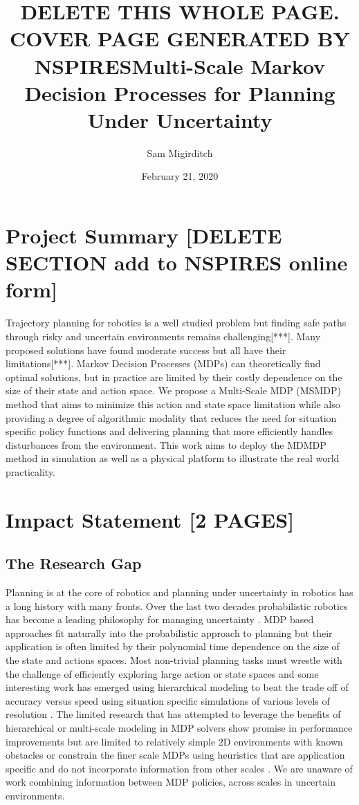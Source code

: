 \documentclass[12pt]{article}
\title{\textbf{DELETE THIS WHOLE PAGE. COVER PAGE GENERATED BY NSPIRES}\linebreak Multi-Scale Markov Decision Processes for Planning Under Uncertainty}
\author{Sam Migirditch}
\date{February 21, 2020}
\begin{document}
\maketitle

\newpage
\section{Project Summary [DELETE SECTION add to NSPIRES online form]}

Trajectory planning for robotics is a well studied problem but finding safe paths through risky and uncertain environments remains challenging[***]. Many proposed solutions have found moderate success but all have their limitations[***]. Markov Decision Processes (MDPs) can theoretically find optimal solutions, but in practice are limited by their costly dependence on the size of their state and action space. We propose a  Multi-Scale MDP (MSMDP) method that aims to minimize this action and state space limitation while also providing a degree of algorithmic modality that reduces the need for situation specific policy functions and delivering planning that more efficiently handles disturbances from the environment. This work aims to deploy the MDMDP method in simulation as well as a physical platform to illustrate the real world practicality. 

\newpage
\section{Impact Statement [2 PAGES]}

\subsection{The Research Gap}

Planning is at the core of robotics and planning under uncertainty in robotics has a long history with many fronts. Over the last two decades probabilistic robotics has become a leading philosophy for managing uncertainty \cite{thrun_probabilistic_2005}. MDP based approaches fit naturally into the probabilistic approach to planning but their application is often limited by their polynomial time dependence on the size of the state and actions spaces. Most non-trivial planning tasks must wrestle with the challenge of efficiently exploring large action or state spaces and some interesting work has emerged using hierarchical modeling to beat the trade off of accuracy versus speed using situation specific simulations of various levels of resolution \cite{fisac_hierarchical_2019}. The limited research that has attempted to leverage the benefits of hierarchical or multi-scale modeling in MDP solvers show promise in performance improvements but are limited to relatively simple 2D environments with known obstacles \cite{bakker_hierarchical_2005} or constrain the finer scale MDPs using heuristics that are application specific and do not incorporate information from other scales \cite{ferguson_focussed_2004}. We are unaware of work combining information between MDP policies, across scales in uncertain environments.
\end{document}

